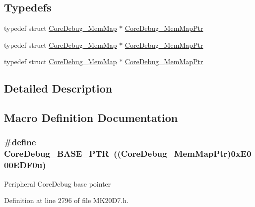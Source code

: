 \subsection*{Typedefs}
\begin{DoxyCompactItemize}
\item 
typedef struct \hyperlink{struct_core_debug___mem_map}{Core\+Debug\+\_\+\+Mem\+Map} $\ast$ \hyperlink{group___core_debug___peripheral_gaa548220bc91b12bd49065fe752579fcd}{Core\+Debug\+\_\+\+Mem\+Map\+Ptr}
\item 
typedef struct \hyperlink{struct_core_debug___mem_map}{Core\+Debug\+\_\+\+Mem\+Map} $\ast$ \hyperlink{group___core_debug___peripheral_gaa548220bc91b12bd49065fe752579fcd}{Core\+Debug\+\_\+\+Mem\+Map\+Ptr}
\item 
typedef struct \hyperlink{struct_core_debug___mem_map}{Core\+Debug\+\_\+\+Mem\+Map} $\ast$ \hyperlink{group___core_debug___peripheral_gaa548220bc91b12bd49065fe752579fcd}{Core\+Debug\+\_\+\+Mem\+Map\+Ptr}
\end{DoxyCompactItemize}


\subsection{Detailed Description}


\subsection{Macro Definition Documentation}
\subsubsection[{\texorpdfstring{Core\+Debug\+\_\+\+B\+A\+S\+E\+\_\+\+P\+TR}{CoreDebug_BASE_PTR}}]{\setlength{\rightskip}{0pt plus 5cm}\#define Core\+Debug\+\_\+\+B\+A\+S\+E\+\_\+\+P\+TR~(({\bf Core\+Debug\+\_\+\+Mem\+Map\+Ptr})0x\+E000\+E\+D\+F0u)}\hypertarget{group___core_debug___peripheral_ga994a185afca30ede538d89322c4f0326}{}\label{group___core_debug___peripheral_ga994a185afca30ede538d89322c4f0326}
Peripheral Core\+Debug base pointer 

Definition at line 2796 of file M\+K20\+D7.\+h.

